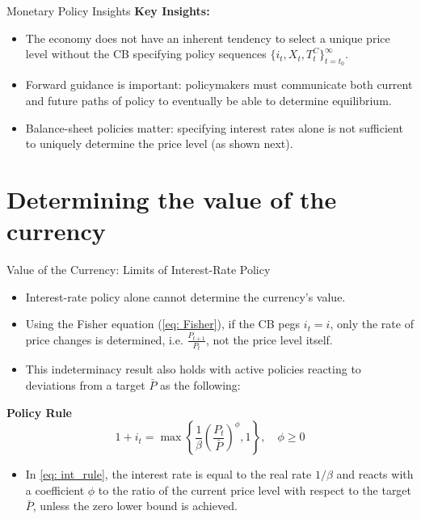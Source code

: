 \documentclass[11pt,aspectratio=169]{beamer}
\begin{document}
\begin{frame}{Monetary Policy Insights}
\textbf{Key Insights:}
\begin{itemize}
    \item The economy does not have an inherent tendency to select a unique price level without the CB specifying policy sequences $\{i_t, X_t, T_t^C\}_{t=t_0}^\infty$.
    \vspace{0.3cm}
    \item Forward guidance is important: policymakers must communicate both current and future paths of policy to eventually be able to determine equilibrium.
    \vspace{0.3cm}
    \item Balance-sheet policies matter: specifying interest rates alone is not sufficient to uniquely determine the price level (as shown next).
\end{itemize}
\end{frame}

\section{Determining the value of the currency}

\begin{frame}{Value of the Currency: Limits of Interest-Rate Policy}
\begin{itemize}
    \item Interest-rate policy alone cannot determine the currency's value.
    \item Using the Fisher equation (\ref{eq: Fisher}), if the CB pegs $i_t = i$, only the rate of price changes is determined, i.e. $\frac{P_{t+1}}{P_{t}}$, not the price level itself.
    \item This indeterminacy result also holds with active policies reacting to deviations from a target $\bar{P}$ as the following:
\end{itemize}
\textbf{Policy Rule}
    \begin{equation} \label{eq: int_rule}
        1 + i_t = \max \left\{ \frac{1}{\beta} \left( \frac{P_t}{\bar{P}} \right)^\phi, 1 \right\}, \quad \phi \ge 0
    \end{equation}
\begin{itemize}
    \item In \eqref{eq: int_rule}, the interest rate is equal to the real rate $1/\beta$ and reacts with a coefficient $\phi$ to the ratio of the current price level with respect to the target $\bar{P}$, unless the zero lower bound is achieved.
\end{itemize}
\end{frame}
\end{document}
